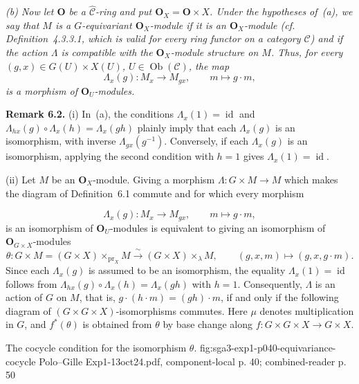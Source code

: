\textit{(b) Now let \(\mathbf O\) be a
\(\widehat{\mathscr C}\)-ring and put
\(\mathbf O_X=\mathbf O\times X\). Under the hypotheses of~(a), we say
that \(M\) is a \(G\)-equivariant \(\mathbf O_X\)-module if it is an
\(\mathbf O_X\)-module (cf. Definition~4.3.3.1, which is valid for every
ring functor on a category \(\mathscr C\)) and if the action \(\Lambda\)
is compatible with the \(\mathbf O_X\)-module structure on \(M\). Thus,
for every \((g,x)\in G(U)\times X(U)\),
\(U\in\operatorname{Ob}(\mathscr C)\), the map}
\[
  \Lambda_x(g):M_x\longrightarrow M_{gx},
  \qquad m\longmapsto g\cdot m,
\]
\textit{is a morphism of \(\mathbf O_U\)-modules.}

\medskip
\noindent\textbf{Remark 6.2.}
(i) In~(a), the conditions
\(\Lambda_x(1)=\operatorname{id}\) and
\(\Lambda_{hx}(g)\circ\Lambda_x(h)=\Lambda_x(gh)\) plainly imply that
each \(\Lambda_x(g)\) is an isomorphism, with inverse
\(\Lambda_{gx}(g^{-1})\). Conversely, if each \(\Lambda_x(g)\) is an
isomorphism, applying the second condition with \(h=1\) gives
\(\Lambda_x(1)=\operatorname{id}\).

(ii) Let \(M\) be an \(\mathbf O_X\)-module. Giving a morphism
\(\Lambda:G\times M\to M\) which makes the diagram of Definition~6.1
commute and for which every morphism

\[
  \Lambda_x(g):M_x\longrightarrow M_{gx},
  \qquad m\longmapsto g\cdot m,
\]
is an isomorphism of \(\mathbf O_U\)-modules is equivalent to giving an
isomorphism of \(\mathbf O_{G\times X}\)-modules
\[
  \theta:
  G\times M=(G\times X)\times_{\mathrm{pr}_X}M
  \xrightarrow{\ \sim\ }(G\times X)\times_\lambda M,
  \qquad
  (g,x,m)\longmapsto(g,x,g\cdot m).
\]
Since each \(\Lambda_x(g)\) is assumed to be an isomorphism, the equality
\(\Lambda_x(1)=\operatorname{id}\) follows from
\(\Lambda_{hx}(g)\circ\Lambda_x(h)=\Lambda_x(gh)\) with \(h=1\).
Consequently, \(\Lambda\) is an action of \(G\) on \(M\), that is,
\(g\cdot(h\cdot m)=(gh)\cdot m\), if and only if the following diagram
of \((G\times G\times X)\)-isomorphisms commutes. Here \(\mu\) denotes
multiplication in \(G\), and \(f^*(\theta)\) is obtained from \(\theta\)
by base change along \(f:G\times G\times X\to G\times X\).

  {The cocycle condition for the isomorphism \(\theta\).}
  {fig:sga3-exp1-p040-equivariance-cocycle}
  {Polo--Gille Exp1-13oct24.pdf, component-local p. 40; combined-reader p. 50}

